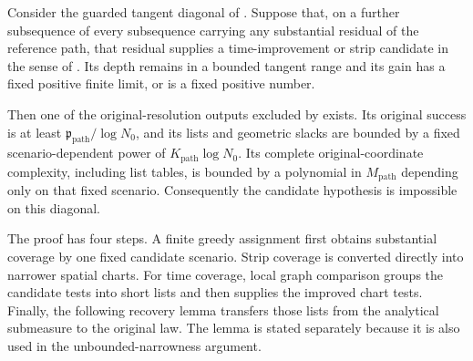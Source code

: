 \begin{proposition}
\label{prop:candidate-upgrade}
Consider the guarded tangent diagonal of
.  Suppose that, on a further subsequence
of every subsequence carrying any substantial residual of the reference
path, that residual supplies a time-improvement or strip candidate
in the sense of .  Its depth remains in a bounded
tangent range and its gain has a fixed positive finite limit, or is
a fixed positive number.

Then one of the original-resolution outputs excluded by
 exists.  Its original success is at least
\(\mathfrak p_{\mathrm{path}}/\log N_0\), and its lists and geometric
slacks are bounded by a fixed scenario-dependent power of
\(K_{\mathrm{path}}\log N_0\).  Its complete original-coordinate
complexity, including list tables, is bounded by a polynomial in
\(M_{\mathrm{path}}\) depending only on that fixed scenario.
Consequently the candidate hypothesis is impossible on this diagonal.
\end{proposition}
The proof has four steps.  A finite greedy assignment first obtains
substantial coverage by one fixed candidate scenario.  Strip coverage is
converted directly into narrower spatial charts.  For time coverage,
local graph comparison groups the candidate tests into short lists and
then supplies the improved chart tests.  Finally, the following recovery
lemma transfers those lists from the analytical submeasure to the original
law.  The lemma is stated separately because it is also used in the
unbounded-narrowness argument.


